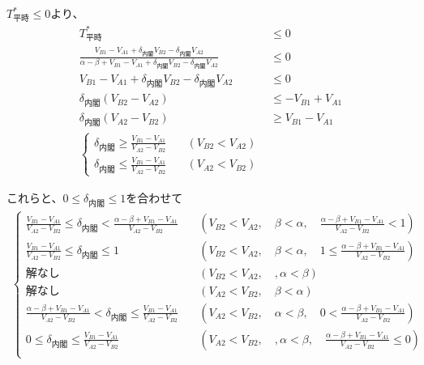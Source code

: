 \documentclass[main.tex]{subfiles}
\begin{document}
$T^*_{平時} \le 0$より、
\begin{align*}
    T^*_{平時} &\le 0 \\
    \frac{ V_{B1} - V_{A1} +\delta_{内閣}V_{B2} - \delta_{内閣}V_{A2} }{ \alpha-\beta + V_{B1}-V_{A1} + \delta_{内閣}V_{B2} - \delta_{内閣}V_{A2} } &\le 0 \\
    V_{B1} - V_{A1} +\delta_{内閣}V_{B2} - \delta_{内閣}V_{A2} &\le 0 \\
    \delta_{内閣}(V_{B2} - V_{A2}) &\le - V_{B1} + V_{A1}\\
    \delta_{内閣}(V_{A2} - V_{B2}) &\ge V_{B1} - V_{A1}\\
    \begin{cases}
        \delta_{内閣} \ge \frac{V_{B1} - V_{A1}}{V_{A2} - V_{B2}} \quad &(V_{B2} < V_{A2}) \\[1em]
        \delta_{内閣} \le \frac{V_{B1} - V_{A1}}{V_{A2} - V_{B2}} \quad &(V_{A2} < V_{B2})
    \end{cases}
\end{align*}


これらと、$0 \le \delta_{内閣} \le 1$を合わせて
\begin{align*}
\begin{cases}
    \frac{ V_{B1} - V_{A1} }{ V_{A2} - V_{B2} } \le \delta_{内閣} <  \frac{\alpha-\beta + V_{B1}-V_{A1}}{V_{A2} - V_{B2}} \quad &(V_{B2} < V_{A2},\quad \beta < \alpha, \quad \frac{\alpha-\beta + V_{B1}-V_{A1}}{V_{A2} - V_{B2}} < 1) \\[1em]
    \frac{ V_{B1} - V_{A1} }{ V_{A2} - V_{B2} } \le \delta_{内閣} \le 1 \quad &(V_{B2} < V_{A2},\quad \beta < \alpha, \quad 1 \le \frac{\alpha-\beta + V_{B1}-V_{A1}}{V_{A2} - V_{B2}}) \\[1em]
    解なし \quad &(V_{B2} < V_{A2},\quad, \alpha < \beta)\\[1em]
    解なし \quad &(V_{A2} < V_{B2},\quad \beta < \alpha) \\[1em]
    \frac{\alpha-\beta + V_{B1}-V_{A1}}{V_{A2} - V_{B2}} < \delta_{内閣} \le   \frac{ V_{B1} - V_{A1} }{ V_{A2} - V_{B2} } \quad &(V_{A2} < V_{B2},\quad \alpha < \beta, \quad  0 < \frac{\alpha-\beta + V_{B1}-V_{A1}}{V_{A2} - V_{B2}}) \\[1em]
    0 \le \delta_{内閣} \le  \frac{ V_{B1} - V_{A1} }{ V_{A2} - V_{B2} } \quad &(V_{A2} < V_{B2},\quad, \alpha < \beta,\quad \frac{\alpha-\beta + V_{B1}-V_{A1}}{V_{A2} - V_{B2}} \le 0)\\[1em]
\end{cases}
\end{align*}
\end{document}
